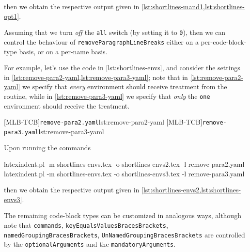 	then we obtain the respective output given in \cref{lst:shortlines-mand1,lst:shortlines-opt1}.


	Assuming that we turn \emph{off} the \texttt{all} switch
	(by setting it to \texttt{0}), then we can control the behaviour of
	\texttt{removeParagraphLineBreaks} either on a per-code-block-type basis, or on a per-name
	basis.

	For example, let's use the code in \cref{lst:shortlines-envs}, and consider the settings
	in \cref{lst:remove-para2-yaml,lst:remove-para3-yaml}; note that in \cref{lst:remove-para2-yaml} we specify that
	\emph{every} environment should receive treatment from the routine, while
	in \cref{lst:remove-para3-yaml} we specify that \emph{only} the
	\texttt{one} environment should receive the treatment.

	\begin{minipage}{.45\linewidth}
	\end{minipage}
	\hfill
	\begin{minipage}{.49\linewidth}
		[MLB-TCB]{\texttt{remove-para2.yaml}}{lst:remove-para2-yaml}
		[MLB-TCB]{\texttt{remove-para3.yaml}}{lst:remove-para3-yaml}
	\end{minipage}

	Upon running the commands
	\begin{widepage}
		\begin{commandshell}
latexindent.pl -m shortlines-envs.tex -o shortlines-envs2.tex -l remove-para2.yaml
latexindent.pl -m shortlines-envs.tex -o shortlines-envs3.tex -l remove-para3.yaml
\end{commandshell}
	\end{widepage}
	then we obtain the respective output given in \cref{lst:shortlines-envs2,lst:shortlines-envs3}.


	The remaining code-block types can be customized in analogous ways, although note that
	\texttt{commands}, \texttt{keyEqualsValuesBracesBrackets}, \texttt{namedGroupingBracesBrackets},
	\texttt{UnNamedGroupingBracesBrackets} are controlled by the \texttt{optionalArguments} and the
	\texttt{mandatoryArguments}.

